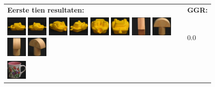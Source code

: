 \begin{figure}[tbp]
\begin{center}
\begin{tabular}{m{11cm} | m{3cm} |}
\textbf{Eerste tien resultaten:} & \textbf{GGR:} \\
\vspace{4pt}
\includegraphics[width=1cm]{coil/beeld-12.eps}
\includegraphics[width=1cm]{coil/beeld-13.eps}
\includegraphics[width=1cm]{coil/beeld-16.eps}
\includegraphics[width=1cm]{coil/beeld-15.eps}
\includegraphics[width=1cm]{coil/beeld-17.eps}
\includegraphics[width=1cm]{coil/beeld-14.eps}
\includegraphics[width=1cm]{coil/beeld-44.eps}
\includegraphics[width=1cm]{coil/beeld-1.eps}
\includegraphics[width=1cm]{coil/beeld-5.eps}
\includegraphics[width=1cm]{coil/beeld-4.eps}
& {\scriptsize 0.0}
\\
\includegraphics[width=1cm]{coil/beeld-6.eps}

\end{tabular}
\end{center}
\end{figure}
